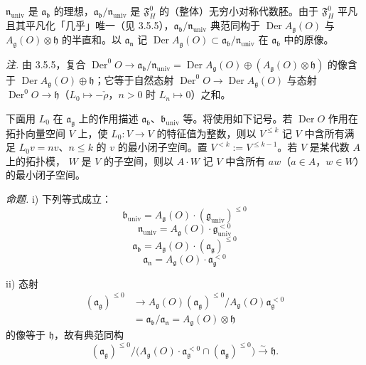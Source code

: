 $\mathfrak{n}_{\mathrm{univ}}$ 是 $\mathfrak{a}_{\mathfrak{b}}$ 的理想，$\mathfrak{a}_{\mathfrak{b}}/\mathfrak{n}_{\mathrm{univ}}$ 是 $\mathfrak{F}^{0}_{H}$ 的（整体）无穷小对称代数胚。由于 $\mathfrak{F}^{0}_{H}$ 平凡且其平凡化「几乎」唯一（见 3.5.5），$\mathfrak{a}_{\mathfrak{b}}/\mathfrak{n}_{\mathrm{univ}}$ 典范同构于 $\operatorname{Der}A_{\mathfrak{g}}(O)$ 与 $A_{\mathfrak{g}}(O)\otimes\mathfrak{h}$ 的半直和。以 $\mathfrak{a}_{\mathfrak{n}}$ 记 $\operatorname{Der}A_{\mathfrak{g}}(O)\subset\mathfrak{a}_{\mathfrak{b}}/\mathfrak{n}_{\mathrm{univ}}$ 在 $\mathfrak{a}_{\mathfrak{b}}$ 中的原像。

\emph{注.} 由 3.5.5，复合 $\operatorname{Der}^{0}O\to\mathfrak{a}_{\mathfrak{b}}/\mathfrak{n}_{\mathrm{univ}}=\operatorname{Der}A_{\mathfrak{g}}(O)\oplus(A_{\mathfrak{g}}(O)\otimes\mathfrak{h})$ 的像含于 $\operatorname{Der}A_{\mathfrak{g}}(O)\oplus\mathfrak{h}$；它等于自然态射 $\operatorname{Der}^{0}O\to\operatorname{Der}A_{\mathfrak{g}}(O)$ 与态射 $\operatorname{Der}^{0}O\to\mathfrak{h}$（$L_{0}\mapsto-\check\rho$，$n>0$ 时 $L_{n}\mapsto0$）之和。

 下面用 $L_{0}$ 在 $\mathfrak{a}_{\mathfrak{g}}$ 上的作用描述 $\mathfrak{a}_{\mathfrak{b}}$、$\mathfrak{b}_{\mathrm{univ}}$ 等。将使用如下记号。若 $\operatorname{Der}O$ 作用在拓扑向量空间 $V$ 上，使 $L_{0}:V\to V$ 的特征值为整数，则以 $V^{\le k}$ 记 $V$ 中含所有满足 $L_{0}v=nv$、$n\le k$ 的 $v$ 的最小闭子空间。置 $V^{<k}:=V^{\le k-1}$。若 $V$ 是某代数 $A$ 上的拓扑模，%
$W$ 是 $V$ 的子空间，则以 $A\cdot W$ 记 $V$ 中含所有 $aw$（$a\in A$，$w\in W$）的最小闭子空间。

 \emph{命题.} i) 下列等式成立：
\begin{equation}\tag{74}
\mathfrak{b}_{\mathrm{univ}}=A_{\mathfrak{g}}(O)\cdot(\mathfrak{g}_{\mathrm{univ}})^{\le0}
\end{equation}
\begin{equation}\tag{75}
\mathfrak{n}_{\mathrm{univ}}=A_{\mathfrak{g}}(O)\cdot\mathfrak{g}_{\mathrm{univ}}^{<0}
\end{equation}
\begin{equation}\tag{76}
\mathfrak{a}_{\mathfrak{b}}=A_{\mathfrak{g}}(O)\cdot(\mathfrak{a}_{\mathfrak{g}})^{\le0}
\end{equation}
\begin{equation}\tag{77}
\mathfrak{a}_{\mathfrak{n}}=A_{\mathfrak{g}}(O)\cdot\mathfrak{a}_{\mathfrak{g}}^{<0}
\end{equation}

ii) 态射
\[
\begin{aligned}
(\mathfrak{a}_{\mathfrak{g}})^{\le0}&\longrightarrow
A_{\mathfrak{g}}(O)(\mathfrak{a}_{\mathfrak{g}})^{\le0}/A_{\mathfrak{g}}(O)\mathfrak{a}_{\mathfrak{g}}^{<0}\\
&=\mathfrak{a}_{\mathfrak{b}}/\mathfrak{a}_{\mathfrak{n}}=A_{\mathfrak{g}}(O)\otimes\mathfrak{h}
\end{aligned}
\]
的像等于 $\mathfrak{h}$，故有典范同构
\begin{equation}\tag{78}
(\mathfrak{a}_{\mathfrak{g}})^{\le0}\big/\bigl(A_{\mathfrak{g}}(O)\cdot\mathfrak{a}_{\mathfrak{g}}^{<0}\cap(\mathfrak{a}_{\mathfrak{g}})^{\le0}\bigr)\xrightarrow{\sim}\mathfrak{h}.
\end{equation}

